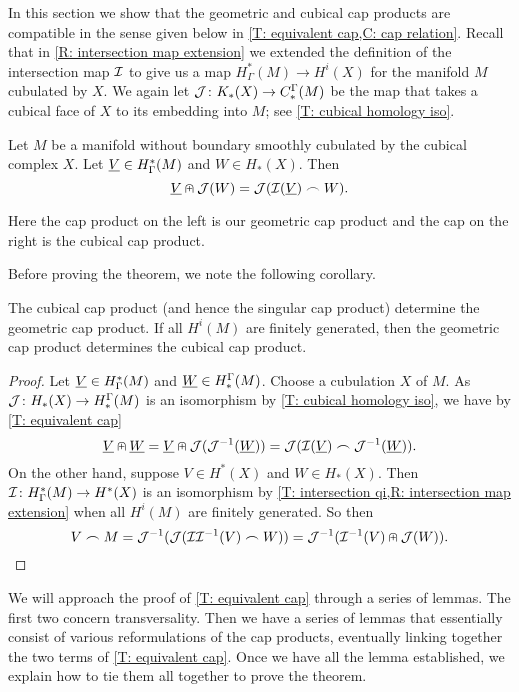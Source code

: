 In this section we show that the geometric and cubical cap products are compatible in the sense given below in \cref{T: equivalent cap,C: cap relation}.
Recall that in \cref{R: intersection map extension} we extended the definition of the intersection map $\mathcal{I}$ to give us a map $H^*_\Gamma(M) \to H^i(X)$ for the manifold $M$ cubulated by $X$.
We again let $\mathcal{J} \colon K_*(X) \to C^\Gamma_*(M)$ be the map that takes a cubical face of $X$ to its embedding into $M$; see \cref{T: cubical homology iso}.

\begin{theorem}\label{T: equivalent cap}
	Let $M$ be a manifold without boundary smoothly cubulated by the cubical complex $X$.
	Let $\underline{V} \in H^*_\Gamma(M)$ and $W \in H_*(X )$.
	Then
	$$\underline{V} \nplus \mathcal{J}(W) = \mathcal{J}(\mathcal{I}(\underline{V})\frown W).$$
\end{theorem}

Here the cap product on the left is our geometric cap product and the cap on the right is the cubical cap product.

Before proving the theorem, we note the following corollary.

\begin{corollary}\label{C: cap relation}
	The cubical cap product (and hence the singular cap product) determine the geometric cap product.
	If all $H^i(M)$ are finitely generated, then the geometric cap product determines the cubical cap product.
\end{corollary}

\begin{proof}
	Let $\underline{V} \in H^*_\Gamma(M)$ and $\underline{W} \in H_*^\Gamma(M)$.
	Choose a cubulation $X$ of $M$.
	As $\mathcal{J} \colon H_*(X) \to H_*^\Gamma(M)$ is an isomorphism by \cref{T: cubical homology iso}, we have by \cref{T: equivalent cap}
	$$\underline{V}\nplus \underline{W} = \underline{V}\nplus \mathcal{J}(\mathcal{J}^{-1}(\underline{W})) = \mathcal{J}(\mathcal{I}(\underline{V})\frown \mathcal{J}^{-1}(\underline{W})).$$
	On the other hand, suppose $V \in H^*(X)$ and $W \in H_*(X)$.
	Then $\mathcal{I} \colon H^*_\Gamma(M) \to H^*(X)$ is an isomorphism by \cref{T: intersection qi,R: intersection map extension} when all $H^i(M)$ are finitely generated.
	So then
	$$V\frown M = \mathcal{J}^{-1}(\mathcal{J}(\mathcal{I}\mathcal{I}^{-1}(V)\frown W)) = \mathcal{J}^{-1}(\mathcal{I}^{-1}(V) \nplus \mathcal{J}(W)).$$
\end{proof}

We will approach the proof of \cref{T: equivalent cap} through a series of lemmas.
The first two concern transversality.
Then we have a series of lemmas that essentially consist of various reformulations of the cap products, eventually linking together the two terms of \cref{T: equivalent cap}.
Once we have all the lemma established, we explain how to tie them all together to prove the theorem.

